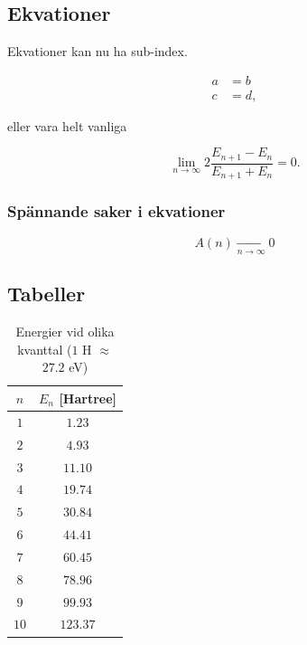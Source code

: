 \subsection{Ekvationer}
\label{subsec:eq}
Ekvationer kan nu ha sub-index.

\begin{subequations}
\begin{align}
a & = b \label{eq:a} \\
c &= d, \label{eq:b}
\end{align}
\end{subequations}

eller vara helt vanliga

\begin{equation}
  \lim_{n \to \infty}2\frac{E_{n+1}-E_{n}}{E_{n+1}+E_{n}}=0.
\label{eq:limn}
\end{equation}
\subsubsection{Spännande saker i ekvationer}
\label{subsubsec:spannend}
\begin{equation}
 A(n)\xrightarrow[n\to\infty]{}0
\end{equation}

\subsection{Tabeller}
\begin{table}
  \begin{center}
  \caption[Energier vid olika kvanttal]{Energier vid olika kvanttal ($1$ H $\approx$ $27.2$ eV)}
    \begin{tabular}{cc}\toprule
      $n$ & $E_n$ [Hartree]\\ \midrule
      $1$ & $1.23$ \\
      $2$ & $4.93$ \\
      $3$ & $11.10$\\
      $4$ & $19.74$\\
      $5$ & $30.84$\\
      $6$ & $44.41$\\
      $7$ & $60.45$\\
      $8$ & $78.96$\\
      $9$ & $99.93$\\
      $10$ &$123.37$\\ \bottomrule
    \end{tabular}

\label{tbl:energy}
  \end{center}
\end{table}

